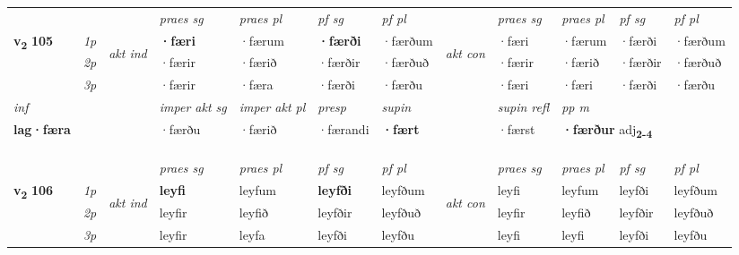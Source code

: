 \begin{longtable}[l]{X>{\footnotesize\itshape}llXXXXlXXXX}
 & &   & \textit{praes sg}  & \textit{praes pl}    & \textit{ pf sg} & \textit{pf pl} & & \textit{praes sg}  & \textit{praes pl}    & \textit{pf sg} & \textit{pf pl }  \\ \cmidrule{4-7} \cmidrule{9-12}
 \multirow{2}{*}{{{\textbf{v{\textsubscript{2}}} \Large{\textbf{105}}}}}  & 1p & \multirow{3}{*}{\begin{turn}{90}\textit{akt ind}\end{turn}} & \textbf{·færi} & ·færum & \textbf{·færði} & ·færðum & \multirow{3}{*}{\begin{turn}{90}\textit{akt con}\end{turn}} &·færi & ·færum & ·færði & ·færðum\\*
 & 2p &  &  ·færir  & ·færið & ·færðir & ·færðuð & & ·færir & ·færið & ·færðir & ·færðuð \\*
 & 3p &  & ·færir & ·færa & ·færði & ·færðu & & ·færi & ·færi& ·færði & ·færðu \\*
\cmidrule{4-7} \cmidrule{9-12}

   {\textit{inf}} & &  & \textit{imper akt sg} & \textit{imper akt pl}   & \textit{presp} & \textit{supin} && \textit{supin refl} & \textit{pp m} \\*
  {\textbf{lag\allowbreak ·færa}} & && ·færðu  & ·færið   & ·færandi &  \textbf{·fært} && ·færst & \multicolumn{2}{l}{\textbf{·færður} adj\textbf{\textsubscript{2-4}}} \\*

\midrule
& \\*
  & \\*
  & \\
    \midrule
 & &   & \textit{praes sg}  & \textit{praes pl}    & \textit{ pf sg} & \textit{pf pl} & & \textit{praes sg}  & \textit{praes pl}    & \textit{pf sg} & \textit{pf pl }  \\ \cmidrule{4-7} \cmidrule{9-12}
 \multirow{2}{*}{{{\textbf{v{\textsubscript{2}}} \Large{\textbf{106}}}}}  & 1p & \multirow{3}{*}{\begin{turn}{90}\textit{akt ind}\end{turn}} & \textbf{leyfi} & leyfum & \textbf{leyfði} & leyfðum & \multirow{3}{*}{\begin{turn}{90}\textit{akt con}\end{turn}} &leyfi & leyfum & leyfði & leyfðum\\*
 & 2p &  &  leyfir  & leyfið & leyfðir & leyfðuð & & leyfir & leyfið & leyfðir & leyfðuð \\*
 & 3p &  & leyfir & leyfa & leyfði & leyfðu & & leyfi & leyfi& leyfði & leyfðu \\*
\cmidrule{4-7} \cmidrule{9-12}


\end{longtable}
